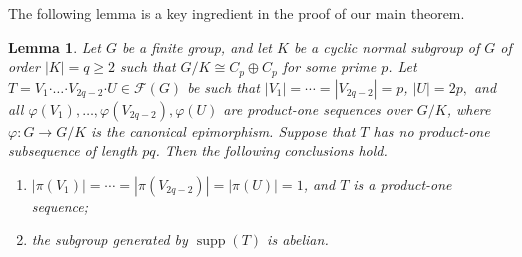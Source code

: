 \documentclass[a4paper, 12pt]{article}
\newtheorem{lemma}[theorem]{Lemma}
\theoremstyle{definition}
\DeclareMathOperator{\supp}{supp}
\begin{document}
The following lemma is a key ingredient in the proof of our main theorem.

\begin{lemma}\label{lemma:blockwithstructure} Let $G$ be a finite group, and let $K$ be a cyclic normal subgroup of $G$ of order $|K|=q\geq 2$ such that
$G/K\cong C_p\oplus C_p$ for some prime $p$.  Let
$T=V_1\boldsymbol{\cdot}\ldots\boldsymbol{\cdot}V_{2q-2}
\boldsymbol{\cdot}U \in \mathcal{F}(G)$
be such that
$|V_1|=\cdots=|V_{2q-2}|=p$, $|U|=2p,$
and all $\varphi(V_1),\ldots,\varphi(V_{2q-2}),\varphi(U)$ are product-one sequences over
$G/K$, where $\varphi: G\rightarrow G/K$ is the canonical epimorphism. Suppose
that $T$ has no product-one subsequence of length $pq$.  Then the following conclusions hold.

\begin{enumerate}[label=\rm(\roman*)]
\item $|\pi(V_1)|=\cdots=|\pi(V_{2q-2})|=|\pi(U)|=1$, and $T$ is a product-one sequence;
\item the subgroup generated by $\supp(T)$ is abelian.
\end{enumerate}
\end{lemma}
\end{document}
